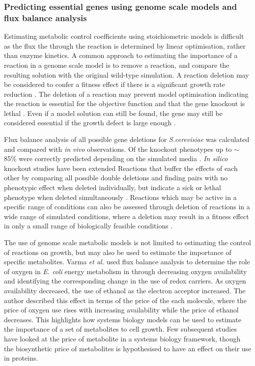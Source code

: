 \subsubsection{Predicting essential genes using genome scale models and flux balance analysis}

Estimating metabolic control coefficients using stoichiometric models is difficult as the flux the through the reaction is determined by linear optimisation, rather than enzyme kinetics. A common approach to estimating the importance of a reaction in a genome scale model is to remove a reaction, and compare the resulting solution with the original wild-type simulation. A reaction deletion may be considered to confer a fitness effect if there is a significant growth rate reduction \cite{pal2006}. The deletion of a reaction may prevent model optimisation indicating the reaction is essential for the objective function and that the gene knockout is lethal \cite{becker2008}.  Even if a model solution can still be found, the gene may still be considered essential if the growth defect is large enough \cite{papp2004,wang2009}.

Flux balance analysis of all possible gene deletions for \emph{S.cerevisiae} was calculated and compared with \emph{in vivo} observations. Of the knockout phenotypes up to $\sim$85\% were correctly predicted depending on the simulated media \cite{famili2003,forster2003}. \emph{In silico} knockout studies have been extended Reactions that buffer the effects of each other by comparing all possible double deletions and finding pairs with no phenotypic effect when deleted individually, but indicate a sick or lethal phenotype when deleted simultaneously \cite{harrison2007}. Reactions which may be active in a specific range of conditions can also be assessed through deletion of reactions in a wide range of simulated conditions, where a deletion may result in a fitness effect in only a small range of biologically feasible conditions \cite{papp2004}.

The use of genome scale metabolic models is not limited to estimating the control of reactions on growth, but may also be used to estimate the importance of specific metabolites. Varma \emph{et al.} \cite{varma1993} used flux balance analysis to determine the role of oxygen in \emph{E. coli} energy metabolism in through decreasing oxygen availability and identifying the corresponding change in the use of redox carriers. As oxygen availability decreased, the use of ethanol as the electron acceptor increased. The author described this effect in terms of the price of the each molecule, where the price of oxygen use rises with increasing availability while the price of ethanol decreases. This highlights how systems biology models can be used to estimate the importance of a set of metabolites to cell growth. Few subsequent studies have looked at the price of metabolite in a systems biology framework, though the biosynthetic price of metabolites is hypothesised to have an effect on their use in proteins.

